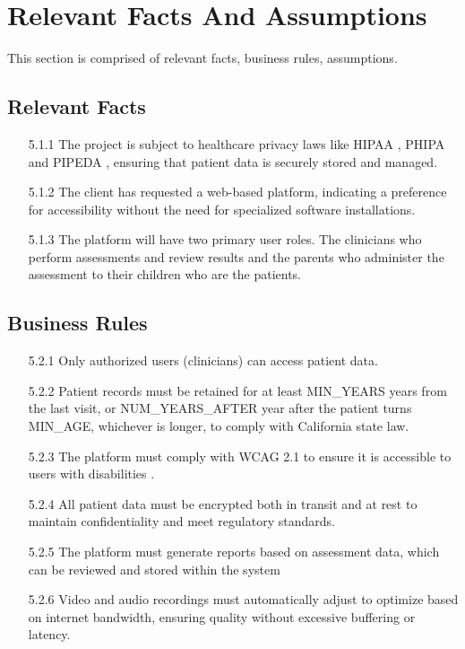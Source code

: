\documentclass[12pt]{article}
\begin{document}
\newpage

\section{Relevant Facts And Assumptions}
\hspace{2em} This section is comprised of relevant facts, business rules, assumptions.
\subsection{Relevant Facts}
\begin{itemize}
  \item[5.1.1] The project is subject to healthcare privacy laws like HIPAA \cite{hipaa}, PHIPA \cite{phipa} and PIPEDA \cite{pipeda}, ensuring that patient data is securely stored and managed.
  \item[5.1.2] The client has requested a web-based platform, indicating a preference for accessibility without the need for specialized 
  software installations.
  \item[5.1.3] The platform will have two primary user roles. The clinicians who perform assessments and review results and the parents who 
  administer the assessment to their children who are the patients.
\end{itemize}
\subsection{Business Rules}
\begin{itemize}
  \item[5.2.1] Only authorized users (clinicians) can access patient data.
  \item[5.2.2] Patient records must be retained for at least MIN\_YEARS years from the last visit, or NUM\_YEARS\_AFTER year after the patient turns MIN\_AGE, whichever is longer, 
  to comply with California state law.
  \item[5.2.3] The platform must comply with WCAG 2.1 to ensure it is accessible to users with disabilities \cite{wcag}.
  \item[5.2.4] All patient data must be encrypted both in transit and at rest to maintain confidentiality and meet regulatory standards.
  \item[5.2.5] The platform must generate reports based on assessment data, which can be reviewed and stored within the system 
  \item[5.2.6] Video and audio recordings must automatically adjust to optimize based on internet bandwidth, ensuring quality without excessive 
  buffering or latency.
\end{itemize}
\end{document}
